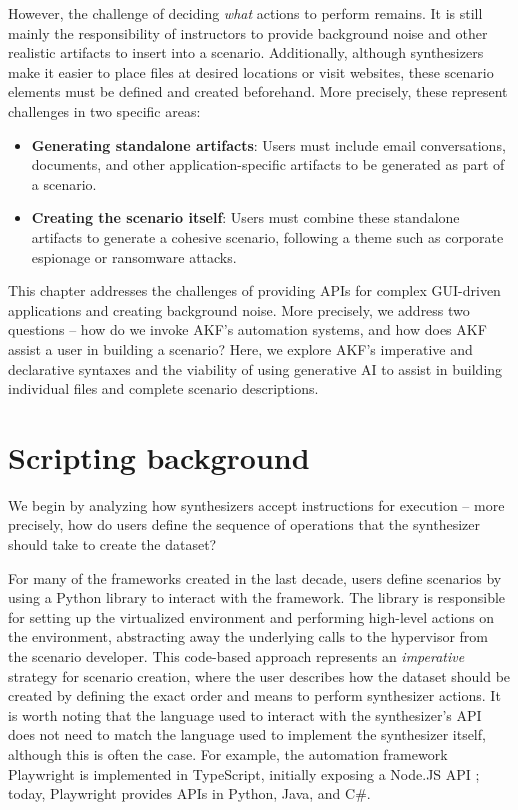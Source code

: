 \documentclass[letterpaper,12pt]{report}
\def\tightlist{}
\begin{document}
However, the challenge of deciding \emph{what} actions to perform
remains. It is still mainly the responsibility of instructors to provide
background noise and other realistic artifacts to insert into a
scenario. Additionally, although synthesizers make it easier to place
files at desired locations or visit websites, these scenario elements
must be defined and created beforehand. More precisely, these represent
challenges in two specific areas:

\begin{itemize}
\tightlist
\item
  \textbf{Generating standalone artifacts}: Users must include email
  conversations, documents, and other application-specific artifacts to
  be generated as part of a scenario.
\item
  \textbf{Creating the scenario itself}: Users must combine these
  standalone artifacts to generate a cohesive scenario, following a
  theme such as corporate espionage or ransomware attacks.
\end{itemize}

This chapter addresses the challenges of providing APIs for complex
GUI-driven applications and creating background noise. More precisely,
we address two questions -- how do we invoke AKF's automation systems,
and how does AKF assist a user in building a scenario? Here, we explore
AKF's imperative and declarative syntaxes and the viability of using
generative AI to assist in building individual files and complete
scenario descriptions.

\section{Scripting background}\label{scripting-background}

We begin by analyzing how synthesizers accept instructions for execution
-- more precisely, how do users define the sequence of operations that
the synthesizer should take to create the dataset?

For many of the frameworks created in the last decade, users define
scenarios by using a Python library to interact with the framework. The
library is responsible for setting up the virtualized environment and
performing high-level actions on the environment, abstracting away the
underlying calls to the hypervisor from the scenario developer. This
code-based approach represents an \emph{imperative} strategy for
scenario creation, where the user describes how the dataset should be
created by defining the exact order and means to perform synthesizer
actions. It is worth noting that the language used to interact with the
synthesizer's API does not need to match the language used to implement
the synthesizer itself, although this is often the case. For example,
the automation framework Playwright is implemented in TypeScript,
initially exposing a Node.JS API
\cite{MicrosoftPlaywrightpython2025}; today, Playwright provides
APIs in Python, Java, and C\#.
\end{document}
